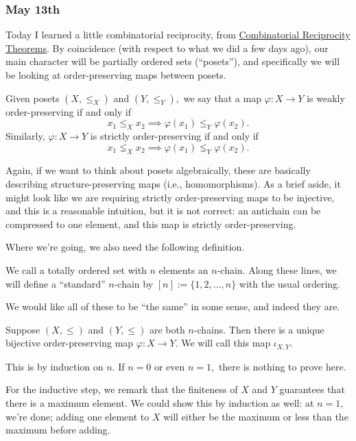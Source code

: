 \subsubsection{May 13th}
Today I learned a little combinatorial reciprocity, from \href{https://web.archive.org/web/20201112023302/http://math.sfsu.edu/beck/papers/crt.pdf}{Combinatorial Reciprocity Theorems}. By coincidence (with respect to what we did a few days ago), our main character will be partially ordered sets (``posets''), and specifically we will be looking at order-preserving maps between posets.
\begin{definition}
    Given posets $(X,\le_X)$ and $(Y,\le_Y),$ we say that a map $\varphi:X\to Y$ is weakly order-preserving if and only if
    \[x_1\le_Xx_2\implies\varphi(x_1)\le_Y\varphi(x_2).\]
    Similarly, $\varphi:X\to Y$ is strictly order-preserving if and only if
    \[x_1\lneq_Xx_2\implies\varphi(x_1)\lneq_Y\varphi(x_2).\]
\end{definition}
Again, if we want to think about posets algebraically, these are basically describing structure-preserving maps (i.e., homomorphisms). As a brief aside, it might look like we are requiring strictly order-preserving maps to be injective, and this is a reasonable intuition, but it is not correct: an antichain can be compressed to one element, and this map is strictly order-preserving.

Where we're going, we also need the following definition.
\begin{definition}
    We call a totally ordered set with $n$ elements an $n$-chain. Along these lines, we will define a ``standard'' $n$-chain by $[n]:=\{1,2,\ldots,n\}$ with the usual ordering.
\end{definition}
We would like all of these to be ``the same'' in some sense, and indeed they are.
\begin{lemma}
    Suppose $(X,\le)$ and $(Y,\le)$ are both $n$-chains. Then there is a unique bijective order-preserving map $\varphi:X\to Y.$ We will call this map $\iota_{X,Y}.$
\end{lemma}
This is by induction on $n.$ If $n=0$ or even $n=1,$ there is nothing to prove here.

For the inductive step, we remark that the finiteness of $X$ and $Y$ guarantees that there is a maximum element. We could show this by induction as well: at $n=1,$ we're done; adding one element to $X$ will either be the maximum or less than the maximum before adding.

